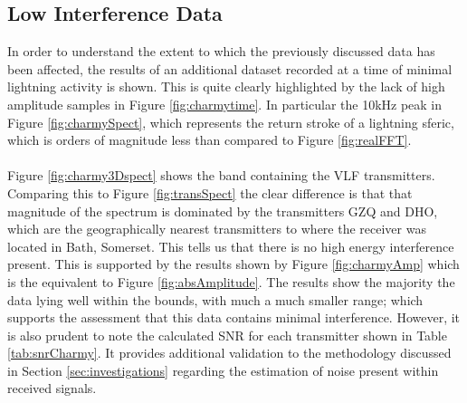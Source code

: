\subsection{Low Interference Data}
In order to understand the extent to which the previously discussed data has been affected, the results of an additional dataset recorded at a time of minimal lightning activity is shown. This is quite clearly highlighted by the lack of high amplitude samples in Figure \ref{fig:charmytime}. In particular the 10kHz peak in Figure \ref{fig:charmySpect}, which represents the return stroke of a lightning sferic, which is orders of magnitude less than compared to Figure \ref{fig:realFFT}.
\\\\
Figure \ref{fig:charmy3Dspect} shows the band containing the VLF transmitters. Comparing this to Figure \ref{fig:transSpect} the clear difference is that that magnitude of the spectrum is dominated by the transmitters GZQ and DHO, which are the geographically nearest transmitters to where the receiver was located in Bath, Somerset. This tells us that there is no high energy interference present. This is supported by the results shown by Figure \ref{fig:charmyAmp} which is the equivalent to Figure \ref{fig:absAmplitude}. The results show the majority the data lying well within the bounds, with much a much smaller range; which supports the assessment that this data contains minimal interference. However, it is also prudent to note the calculated SNR for each transmitter shown in Table \ref{tab:snrCharmy}. It provides additional validation to the methodology discussed in Section \ref{sec:investigations} regarding the estimation of noise present within received signals.
